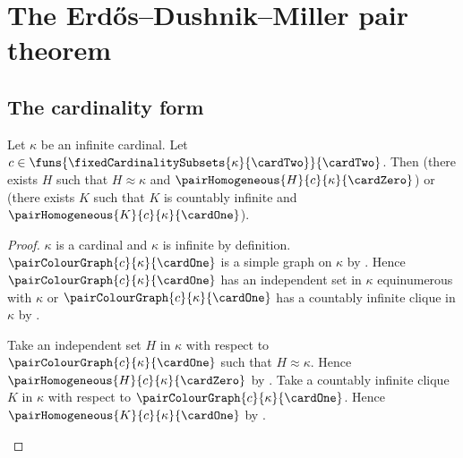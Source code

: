 \section{The Erdős--Dushnik--Miller pair theorem}








\subsection{The cardinality form}

\begin{theorem}\label{erdos_dushnik_miller_pair_cardinality}
    Let $\kappa$ be an infinite cardinal.
    Let $c\in\funs{\fixedCardinalitySubsets{\kappa}{\cardTwo}}
        {\cardTwo}$.
    Then (there exists $H$ such that $H\approx\kappa$ and
            $\pairHomogeneous{H}{c}{\kappa}{\cardZero}$) or
        (there exists $K$ such that $K$ is countably infinite and
            $\pairHomogeneous{K}{c}{\kappa}{\cardOne}$).
\end{theorem}
\begin{proof}
    $\kappa$ is a cardinal and $\kappa$ is infinite by definition.
    $\pairColourGraph{c}{\kappa}{\cardOne}$ is a simple graph on $\kappa$ by
        .
    Hence $\pairColourGraph{c}{\kappa}{\cardOne}$ has an independent set
            in $\kappa$ equinumerous with $\kappa$ or
        $\pairColourGraph{c}{\kappa}{\cardOne}$ has a countably infinite clique
            in $\kappa$ by
        .
    \begin{byCase}
            Take an independent set $H$ in $\kappa$ with respect to
                $\pairColourGraph{c}{\kappa}{\cardOne}$ such that $H\approx\kappa$.
            Hence $\pairHomogeneous{H}{c}{\kappa}{\cardZero}$ by
                .
            Take a countably infinite clique $K$ in $\kappa$ with respect to
                $\pairColourGraph{c}{\kappa}{\cardOne}$.
            Hence $\pairHomogeneous{K}{c}{\kappa}{\cardOne}$ by
                .
    \end{byCase}
\end{proof}

